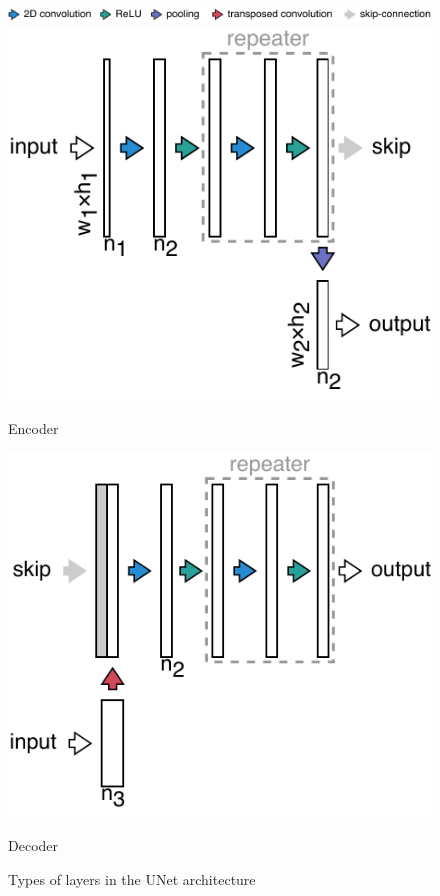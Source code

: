 \begin{figure}[ht]
    \centering
    \begin{subcaptionblock}[c]{\textwidth}
        \centering
        \includegraphics[width=\textwidth]{images/unet_legend.pdf}
    \end{subcaptionblock}
    \begin{subcaptionblock}[t]{.45\textwidth}
        \centering
        \includegraphics[height=0.8\textwidth]{images/unet_encoder.pdf}
        \caption[One layer of UNet decoder]{\label{fig:unet_encoder_layer}Encoder}
    \end{subcaptionblock}
    \begin{subcaptionblock}[t]{.45\textwidth}
        \centering
        \includegraphics[height=0.8
        \textwidth]{images/unet_decoder.pdf}
        \caption[One layer of UNet decoder]{\label{fig:unet_decoder_layer}Decoder}
    \end{subcaptionblock}
    \caption[Types of layers in the UNet architecture]{\label{fig:unet_layers}Types of layers in the UNet architecture}
\end{figure}


